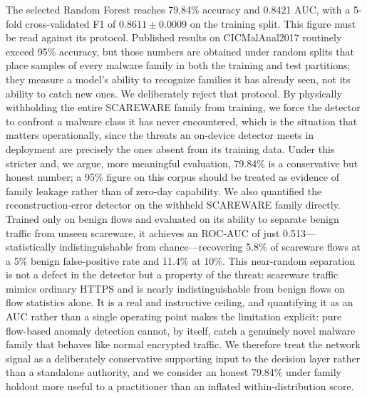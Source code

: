 \documentclass[preprint,12pt,number]{elsarticle}
\begin{document}
The selected Random Forest reaches 79.84\% accuracy and 0.8421 AUC, with a 5-fold cross-validated F1 of $0.8611 \pm 0.0009$ on the training split. This figure must be read against its protocol. Published results on CICMalAnal2017 routinely exceed 95\% accuracy, but those numbers are obtained under random splits that place samples of every malware family in both the training and test partitions; they measure a model's ability to recognize families it has already seen, not its ability to catch new ones. We deliberately reject that protocol. By physically withholding the entire SCAREWARE family from training, we force the detector to confront a malware class it has never encountered, which is the situation that matters operationally, since the threats an on-device detector meets in deployment are precisely the ones absent from its training data. Under this stricter and, we argue, more meaningful evaluation, 79.84\% is a conservative but honest number; a 95\% figure on this corpus should be treated as evidence of family leakage rather than of zero-day capability. \label{sec:scareware}We also quantified the reconstruction-error detector on the withheld SCAREWARE family directly. Trained only on benign flows and evaluated on its ability to separate benign traffic from unseen scareware, it achieves an ROC-AUC of just 0.513---statistically indistinguishable from chance---recovering 5.8\% of scareware flows at a 5\% benign false-positive rate and 11.4\% at 10\%. This near-random separation is not a defect in the detector but a property of the threat: scareware traffic mimics ordinary HTTPS and is nearly indistinguishable from benign flows on flow statistics alone. It is a real and instructive ceiling, and quantifying it as an AUC rather than a single operating point makes the limitation explicit: pure flow-based anomaly detection cannot, by itself, catch a genuinely novel malware family that behaves like normal encrypted traffic. We therefore treat the network signal as a deliberately conservative supporting input to the decision layer rather than a standalone authority, and we consider an honest 79.84\% under family holdout more useful to a practitioner than an inflated within-distribution score.
\end{document}
